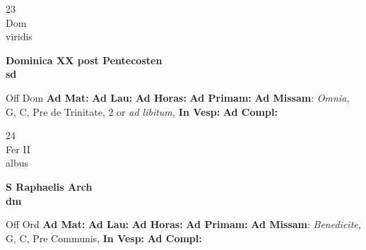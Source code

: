 \documentclass[10pt, openany]{book}
\begin{document}
    \begin{center}
        \begin{minipage}{3.5in}
            \vspace{2em}
            \begin{minipage}{0.5in}
                {\Huge 23} \\
                {\normalsize Dom} \\
                {\normalsize viridis}
            \end{minipage}
            \begin{minipage}{3.0in}
                \textbf{ \large Dominica XX post Pentecosten \\
                \textnormal{\normalsize sd}} \\ 
            \end{minipage}
            \begin{justify}Off Dom
                \textbf{Ad Mat: }
                \textbf{Ad Lau: }
                \textbf{Ad Horas: }
                \textbf{Ad Primam: }\textbf{Ad Missam}: \textit{Omnia,} G, C, Pre de Trinitate, 2 or \textit{ad libitum,}  
                \textbf{In Vesp: }
                \textbf{Ad Compl: }
            \end{justify}
        \end{minipage}
    \end{center}

    \begin{center}
        \begin{minipage}{3.5in}
            \vspace{2em}
            \begin{minipage}{0.5in}
                {\Huge 24} \\
                {\normalsize Fer II} \\
                {\normalsize albus}
            \end{minipage}
            \begin{minipage}{3.0in}
                \textbf{ \large S Raphaelis Arch \\
                \textnormal{\normalsize dm}} \\ 
            \end{minipage}
            \begin{justify}Off Ord
                \textbf{Ad Mat: }
                \textbf{Ad Lau: }
                \textbf{Ad Horas: }
                \textbf{Ad Primam: }\textbf{Ad Missam}: \textit{Benedicite,} G, C, Pre Communis,  
                \textbf{In Vesp: }
                \textbf{Ad Compl: }
            \end{justify}
        \end{minipage}
    \end{center}
\end{document}
